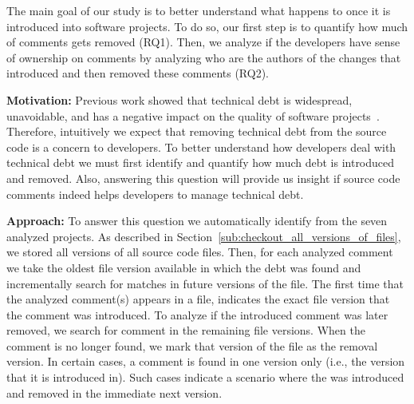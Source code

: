 
The main goal of our study is to better understand what happens to \SATD once it is introduced into software projects. To do so, our first step is to quantify how much of \SATD comments gets removed (RQ1). Then, we analyze if the developers have sense of ownership on \SATD comments by analyzing who are the authors of the changes that introduced and then removed these \SATD comments (RQ2). 


\noindent\rqi
\noindent \textbf{Motivation:} Previous work showed that technical debt is widespread, unavoidable, and has a negative impact on the quality of software projects~\cite{Lim2012Software}. Therefore, intuitively we expect that removing technical debt from the source code is a concern to developers. To better understand how developers deal with technical debt we must first identify and quantify how much debt is introduced and removed. Also, answering this question will provide us insight if source code comments indeed helps developers to manage technical debt. 


\noindent \textbf{Approach:} To answer this question we automatically identify \SATD from the seven analyzed projects. As described in Section~\ref{sub:checkout_all_versions_of_files}, we stored all versions of all source code files. Then, for each analyzed \SATD comment we take the oldest file version available in which the debt was found and incrementally search for matches in future versions of the file. The first time that the analyzed \SATD comment(s) appears in a file, indicates the exact file version that the \SATD comment was introduced. To analyze if the introduced \SATD comment was later removed, we search for comment in the remaining file versions. When the comment is no longer found, we mark that version of the file as the removal version. In certain cases, a \SATD comment is found in one version only (i.e., the version that it is introduced in). Such cases indicate a scenario where the \SATD was introduced and removed in the immediate next version. 



